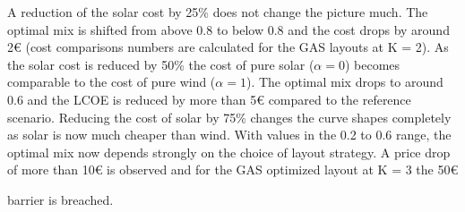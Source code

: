 \documentclass[a4paper, 5p, sort&compress]{elsarticle}%
\begin{document}
A reduction of the solar cost by 25\% does not change the picture
much. The optimal mix is shifted from above 0.8 to below 0.8 and the
cost drops by around 2\euro{}
(cost comparisons numbers are calculated for the GAS layouts at K =
2).  As the solar cost is reduced by 50\% the cost of pure solar
($\alpha=0$) becomes comparable to the cost of pure wind ($\alpha=1$). The
optimal mix drops to around 0.6 and the LCOE is reduced by more than
5\euro{}
compared to the reference scenario. Reducing the cost of solar by 75\%
changes the curve shapes completely as solar is now much cheaper than
wind. With values in the 0.2 to 0.6 range, the optimal mix now depends
strongly on the choice of layout strategy. A price drop of more than
10\euro{}
is observed and for the GAS optimized layout at K = 3 the
50\euro{{} barrier is breached.




}
\end{document}
